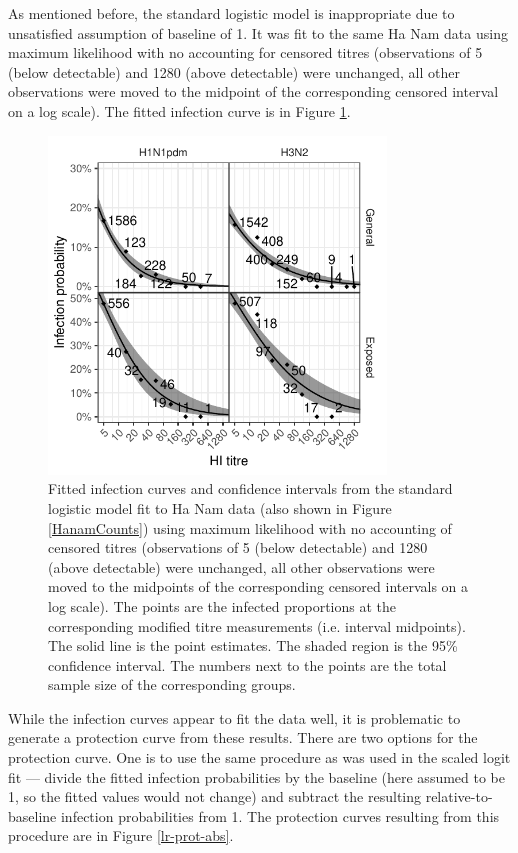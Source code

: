 As mentioned before, the standard logistic model is inappropriate due to unsatisfied assumption of baseline of 1. It was fit to the same Ha Nam data using maximum likelihood with no accounting for censored titres (observations of 5 (below detectable) and 1280 (above detectable) were unchanged, all other observations were moved to the midpoint of the corresponding censored interval on a log scale). The fitted infection curve is in Figure \ref{lr-inf}.

\begin{figure}[htp]
	\centering
	\includegraphics[width=0.8\textwidth]{../fit-logistic-plot/hanam-hi-inf.pdf}
	\caption{
	Fitted infection curves and confidence intervals from the standard logistic model fit to Ha Nam data (also shown in Figure \ref{HanamCounts}) using maximum likelihood with no accounting of censored titres (observations of 5 (below detectable) and 1280 (above detectable) were unchanged, all other observations were moved to the midpoints of the corresponding censored intervals on a log scale). The points are the infected proportions at the corresponding modified titre measurements (i.e. interval midpoints). The solid line is the point estimates. The shaded region is the 95\% confidence interval. The numbers next to the points are the total sample size of the corresponding groups.
	}
	\label{lr-inf}
\end{figure}

While the infection curves appear to fit the data well, it is problematic to generate a protection curve from these results. There are two options for the protection curve. One is to use the same procedure as was used in the scaled logit fit --- divide the fitted infection probabilities by the baseline (here assumed to be 1, so the fitted values would not change) and subtract the resulting relative-to-baseline infection probabilities from 1. The protection curves resulting from this procedure are in Figure \ref{lr-prot-abs}.

